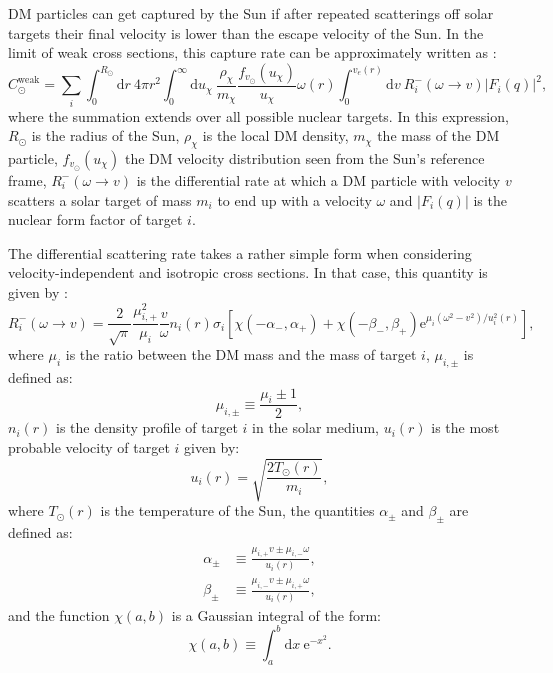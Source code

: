 DM particles can get captured by the Sun if after repeated scatterings off solar targets their final velocity is lower than the escape velocity of the Sun. In the limit of weak cross sections, this capture rate can be approximately written as \cite{Palomares2017}:
\begin{equation}\label{2.5}
	C_{\odot}^{\mathrm{weak}} = \sum_{i} \int_{0}^{R_{\odot}} \mathrm{d}r \ 4\pi r^{2} \int_{0}^{\infty} \mathrm{d}u_{\chi} \ \frac{\rho_{\chi}}{m_{\chi}} \frac{f_{v_{\odot}}(u_{\chi})}{u_{\chi}} \omega(r) \int_{0}^{v_{e}(r)} \mathrm{d}v \ R_{i}^{-}(\omega \rightarrow v) |F_{i}(q)|^{2},
\end{equation}
where the summation extends over all possible nuclear targets. In this expression, $R_{\odot}$ is the radius of the Sun, $\rho_{\chi}$ is the local DM density, $m_{\chi}$ the mass of the DM particle, $f_{v_{\odot}}(u_{\chi})$ the DM velocity distribution seen from the Sun's reference frame, $R_{i}^{-}(\omega \rightarrow v)$ is the differential rate at which a DM particle with velocity $v$ scatters a solar target of mass $m_{i}$ to end up with a velocity $\omega$ and $|F_{i}(q)|$ is the nuclear form factor of target $i$.

The differential scattering rate takes a rather simple form when considering velocity-independent and isotropic cross sections. In that case, this quantity is given by \cite{Gould1987, Palomares2017}:
\begin{equation}\label{2.6}
	R_{i}^{-}(\omega \rightarrow v) = \frac{2}{\sqrt{\pi}} \frac{\mu_{i,+}^{2}}{\mu_{i}} \frac{v}{\omega} n_{i}(r) \sigma_{i} \left[\chi(- \alpha_{-}, \alpha_{+})+\chi(- \beta_{-}, \beta_{+}) \mathrm{e}^{\mu_{i}(\omega^{2}-v^{2})/u_{i}^{2}(r)}\right],
\end{equation}
where $\mu_{i}$ is the ratio between the DM mass and the mass of target $i$, $\mu_{i,\pm}$ is defined as:
\begin{equation}\label{2.7}
	\mu_{i,\pm} \equiv \frac{\mu_{i} \pm 1}{2},
\end{equation}
$n_{i}(r)$ is the density profile of target $i$ in the solar medium, $u_{i}(r)$ is the most probable velocity of target $i$ given by:
\begin{equation}\label{2.8}
	u_{i}(r) = \sqrt{\frac{2 T_{\odot}(r)}{m_{i}}},
\end{equation}
where $T_{\odot}(r)$ is the temperature of the Sun, the quantities $\alpha_{\pm}$ and $\beta_{\pm}$ are defined as:
\begin{align}\label{2.9-2.10}
	\alpha_{\pm} &\equiv \frac{\mu_{i,+} v \pm \mu_{i,-} \omega}{u_{i}(r)},\\
	\beta_{\pm} &\equiv \frac{\mu_{i,-} v \pm \mu_{i,+} \omega}{u_{i}(r)},
\end{align}
and the function $\chi(a,b)$ is a Gaussian integral of the form:
\begin{equation}\label{2.11}
	\chi(a,b) \equiv \int_{a}^{b} \mathrm{d}x \ \mathrm{e}^{-x^{2}}. 
\end{equation}

